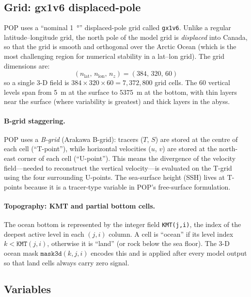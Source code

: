 \documentclass[11pt]{article}
\begin{document}
\subsection{Grid: gx1v6 displaced-pole}
POP uses a ``nominal \SI{1}{\degree}'' displaced-pole grid called
\texttt{gx1v6}. Unlike a regular latitude--longitude grid, the north pole of
the model grid is \emph{displaced} into Canada, so that the grid is smooth and
orthogonal over the Arctic Ocean (which is the most challenging region for
numerical stability in a lat--lon grid). The grid dimensions are:
\begin{equation*}
(n_\text{lat},\, n_\text{lon},\, n_z)
= (384,\, 320,\, 60)
\end{equation*}
so a single 3-D field is $384\times320\times60 = 7{,}372{,}800$ grid cells.
The 60 vertical levels span from \SI{5}{\metre} at the surface to
\SI{5375}{\metre} at the bottom, with thin layers near the surface (where
variability is greatest) and thick layers in the abyss.

\paragraph{B-grid staggering.}
POP uses a \emph{B-grid} (Arakawa B-grid): tracers ($T$, $S$) are stored at
the centre of each cell (``T-point''), while horizontal velocities ($u$, $v$)
are stored at the north-east corner of each cell (``U-point''). This means the
divergence of the velocity field---needed to reconstruct the vertical
velocity---is evaluated on the T-grid using the four surrounding U-points.
The sea-surface height (SSH) lives at T-points because it is a tracer-type
variable in POP's free-surface formulation.

\paragraph{Topography: KMT and partial bottom cells.}
The ocean bottom is represented by the integer field \texttt{KMT(j,i)}, the
index of the deepest active level in each $(j,i)$ column. A cell is ``ocean''
if its level index $k < \texttt{KMT}(j,i)$, otherwise it is ``land'' (or rock
below the sea floor). The 3-D ocean mask $\texttt{mask3d}(k,j,i)$ encodes this
and is applied after every model output so that land cells always carry zero
signal.

\subsection{Variables}
\end{document}
